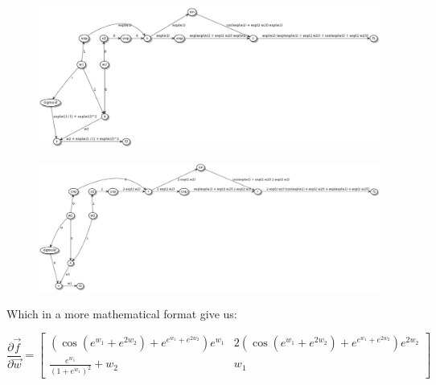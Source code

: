

\begin{figure}
    \begin{center}
        \includegraphics[width=.6\textwidth]{computation_graph_forward_w1.png}
        \label{Forward gradient decent on $\vec{f}$ for $w1$}
    \end{center}
\end{figure}

\begin{figure}
    \begin{center}
        \includegraphics[width=.6\textwidth]{computation_graph_forward_w2.png}
        \label{Forward gradient decent on $\vec{f}$ for $w2$}
    \end{center}
\end{figure}

Which in a more mathematical format give us:

\[
    \frac{\partial \vec{f}}{\partial \vec{w}} =
    \begin{bmatrix}
        ( \cos(e^{w_1} + e^{2 w_2}) + e^{e^{w_1} + e^{2 w_2}} ) e^{w_1}   &   2 ( \cos(e^{w_1} + e^{2 w_2}) + e^{e^{w_1} + e^{2 w_2}} ) e^{2 w_2} \\
        \frac{e^{w_1}}{(1 + e^{w_1})^2} + w_2                             &   w_1
    \end{bmatrix}
\]

